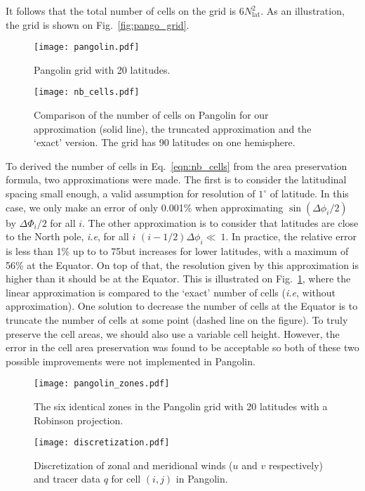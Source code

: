 It follows that the total number of cells on the grid is $6N_{\text{lat}}^2$. As
an illustration, the grid is shown on Fig.~\ref{fig:pango_grid}.
\begin{figure}
  \begin{minipage}[t]{0.49\linewidth}
    \centering
    \texttt{[image: pangolin.pdf]}
    \caption{Pangolin grid with 20 latitudes.}
\label{fig:pango_grid}
  \end{minipage} 
  \hfill
  \begin{minipage}[t]{0.49\linewidth}
    \centering
    \texttt{[image: nb\_cells.pdf]}
    \caption{%
      Comparison of the number of cells on Pangolin for our
      approximation (solid line), the truncated approximation and the `exact'
    version.  The grid has 90 latitudes on one hemisphere.}
\label{fig:nb_cells}
  \end{minipage}
\end{figure}

To derived the number of cells in Eq.~\eqref{eqn:nb_cells} from the area
preservation formula, two approximations were made. The first is to consider the
latitudinal spacing small enough, a valid assumption for
resolution of $1^{\circ}$ of latitude. In this case, we only make an error of
only 0.001\% when approximating $\sin(\Delta\phi_i/2)$ by $\Delta\Phi_i/2$ for
all $i$.
The other approximation is to consider that latitudes are close to the North
pole, \textit{i.e}, for all $i$ $(i-1/2)\Delta\phi_i \ll~1$. 
In practice, the relative error is less than 1\% up to to 75\degree but
increases for lower latitudes, with a maximum of 56\% at the Equator. On top of
that, the resolution given by this approximation is higher than it should be at
the Equator. This is illustrated on Fig.~\ref{fig:nb_cells}, where the linear
approximation is compared to the `exact' number of cells (\textit{i.e}, without
approximation). One solution to decrease the number of cells at the Equator is
to truncate the number of cells at some point (dashed line on the figure). 
To truly preserve the cell areas, we should also use a variable cell height.
However, the error in the cell area preservation was found to be acceptable so
both of these two possible improvements were not implemented in Pangolin.

\begin{figure}
  \begin{minipage}{0.5\linewidth}
    \centering
    \texttt{[image: pangolin\_zones.pdf]}
    \caption{The six identical zones in the Pangolin grid with 20 latitudes with
      a \gls{Robinson projection}.}
\label{fig:pango_zones}
  \end{minipage}
  \hfill
  \begin{minipage}{0.4\linewidth}
    \centering
    \texttt{[image: discretization.pdf]}
    \caption{Discretization of zonal and meridional winds ($u$ and $v$ 
    respectively) and tracer data $q$ for cell $(i,j)$ in Pangolin.}
\label{fig:d-grid}
  \end{minipage}
\end{figure}

